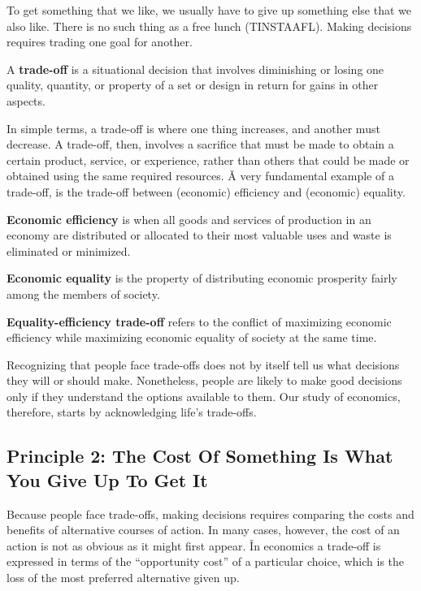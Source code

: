 To get something that we like, we usually have to give up something else that we also like. There is no such thing as
a free lunch (TINSTAAFL). Making decisions requires trading one goal for another.

A \textbf{trade-off} is a situational decision that involves diminishing or losing one quality, quantity, or property
of a set or design in return for gains in other aspects.
\ed

In simple terms, a trade-off is where one thing increases, and another must decrease. A trade-off, then, involves a
sacrifice that must be made to obtain a certain product, service, or experience, rather than others that could be
made or obtained using the same required resources. \v

A very fundamental example of a trade-off, is the trade-off between (economic) efficiency and (economic) equality.

\textbf{Economic efficiency} is when all goods and services of production in an economy are distributed or allocated
to their most valuable uses and waste is eliminated or minimized.
\ed

\textbf{Economic equality} is the property of distributing economic prosperity fairly among the members of society.
\ed

\textbf{Equality-efficiency trade-off} refers to the conflict of maximizing economic efficiency while maximizing
economic equality of society at the same time.
\ed

Recognizing that people face trade-offs does not by itself tell us what decisions they will or should make. Nonetheless,
people are likely to make good decisions only if they understand the options available to them. Our study of economics,
therefore, starts by acknowledging life's trade-offs.

\subsection*{Principle 2: The Cost Of Something Is What You Give Up To Get It}

Because people face trade-offs, making decisions requires comparing the costs and benefits of alternative courses of
action. In many cases, however, the cost of an action is not as obvious as it might first appear. \v

In economics a trade-off is expressed in terms of the ``opportunity cost'' of a particular choice, which is the loss of
the most preferred alternative given up.

